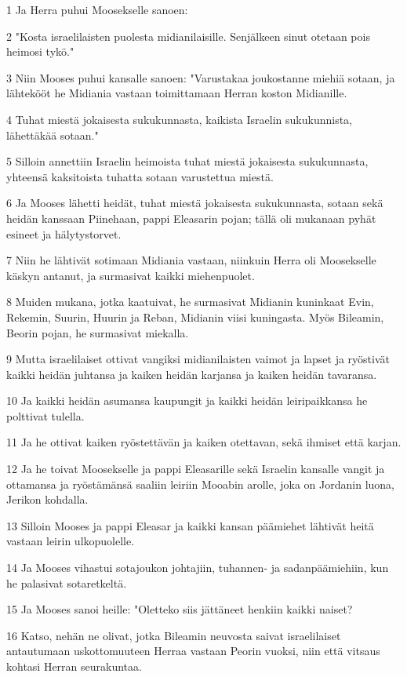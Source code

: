 \par 1 Ja Herra puhui Moosekselle sanoen:
\par 2 "Kosta israelilaisten puolesta midianilaisille. Senjälkeen sinut otetaan pois heimosi tykö."
\par 3 Niin Mooses puhui kansalle sanoen: "Varustakaa joukostanne miehiä sotaan, ja lähtekööt he Midiania vastaan toimittamaan Herran koston Midianille.
\par 4 Tuhat miestä jokaisesta sukukunnasta, kaikista Israelin sukukunnista, lähettäkää sotaan."
\par 5 Silloin annettiin Israelin heimoista tuhat miestä jokaisesta sukukunnasta, yhteensä kaksitoista tuhatta sotaan varustettua miestä.
\par 6 Ja Mooses lähetti heidät, tuhat miestä jokaisesta sukukunnasta, sotaan sekä heidän kanssaan Piinehaan, pappi Eleasarin pojan; tällä oli mukanaan pyhät esineet ja hälytystorvet.
\par 7 Niin he lähtivät sotimaan Midiania vastaan, niinkuin Herra oli Moosekselle käskyn antanut, ja surmasivat kaikki miehenpuolet.
\par 8 Muiden mukana, jotka kaatuivat, he surmasivat Midianin kuninkaat Evin, Rekemin, Suurin, Huurin ja Reban, Midianin viisi kuningasta. Myös Bileamin, Beorin pojan, he surmasivat miekalla.
\par 9 Mutta israelilaiset ottivat vangiksi midianilaisten vaimot ja lapset ja ryöstivät kaikki heidän juhtansa ja kaiken heidän karjansa ja kaiken heidän tavaransa.
\par 10 Ja kaikki heidän asumansa kaupungit ja kaikki heidän leiripaikkansa he polttivat tulella.
\par 11 Ja he ottivat kaiken ryöstettävän ja kaiken otettavan, sekä ihmiset että karjan.
\par 12 Ja he toivat Moosekselle ja pappi Eleasarille sekä Israelin kansalle vangit ja ottamansa ja ryöstämänsä saaliin leiriin Mooabin arolle, joka on Jordanin luona, Jerikon kohdalla.
\par 13 Silloin Mooses ja pappi Eleasar ja kaikki kansan päämiehet lähtivät heitä vastaan leirin ulkopuolelle.
\par 14 Ja Mooses vihastui sotajoukon johtajiin, tuhannen- ja sadanpäämiehiin, kun he palasivat sotaretkeltä.
\par 15 Ja Mooses sanoi heille: "Oletteko siis jättäneet henkiin kaikki naiset?
\par 16 Katso, nehän ne olivat, jotka Bileamin neuvosta saivat israelilaiset antautumaan uskottomuuteen Herraa vastaan Peorin vuoksi, niin että vitsaus kohtasi Herran seurakuntaa.
